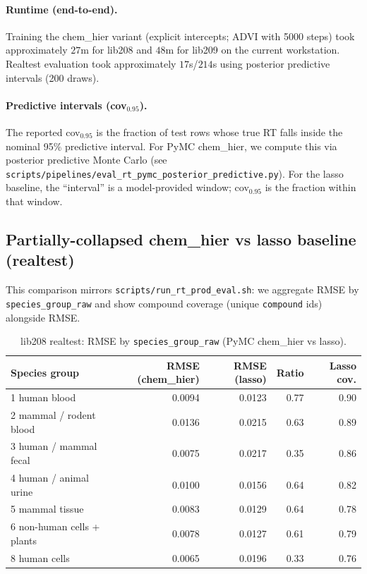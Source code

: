 \documentclass[11pt]{article}
\begin{document}
\paragraph{Runtime (end-to-end).}
Training the chem\_hier variant (explicit intercepts; ADVI with 5000 steps) took approximately
$27$m for lib208 and $48$m for lib209 on the current workstation. Realtest evaluation took approximately $17$s/$214$s using posterior
predictive intervals (200 draws).

\paragraph{Predictive intervals (cov$_{0.95}$).}
The reported cov$_{0.95}$ is the fraction of test rows whose true RT falls inside the nominal 95\% predictive interval.
For PyMC chem\_hier, we compute this via posterior predictive Monte Carlo
(see \texttt{scripts/pipelines/eval\_rt\_pymc\_posterior\_predictive.py}).
For the lasso baseline, the ``interval'' is a model-provided window; cov$_{0.95}$ is the fraction within that window.

\subsection{Partially-collapsed chem\_hier vs lasso baseline (realtest)}

This comparison mirrors \texttt{scripts/run\_rt\_prod\_eval.sh}: we aggregate RMSE by
\texttt{species\_group\_raw} and show compound coverage (unique \texttt{compound} ids) alongside RMSE.

\begin{table}[H]
\centering
\begin{tabular}{p{}rrrr}
\toprule
Species group & RMSE (chem\_hier) & RMSE (lasso) & Ratio & Lasso cov. \\
\midrule
1 human blood & 0.0094 & 0.0123 & 0.77 & 0.90 \\
2 mammal / rodent blood & 0.0136 & 0.0215 & 0.63 & 0.89 \\
3 human / mammal fecal & 0.0075 & 0.0217 & 0.35 & 0.86 \\
4 human / animal urine & 0.0100 & 0.0156 & 0.64 & 0.82 \\
5 mammal tissue & 0.0083 & 0.0129 & 0.64 & 0.78 \\
6 non-human cells + plants & 0.0078 & 0.0127 & 0.61 & 0.79 \\
8 human cells & 0.0065 & 0.0196 & 0.33 & 0.76 \\
\bottomrule
\end{tabular}
\caption{lib208 realtest: RMSE by \texttt{species\_group\_raw} (PyMC chem\_hier vs lasso).}
\end{table}
\end{document}
